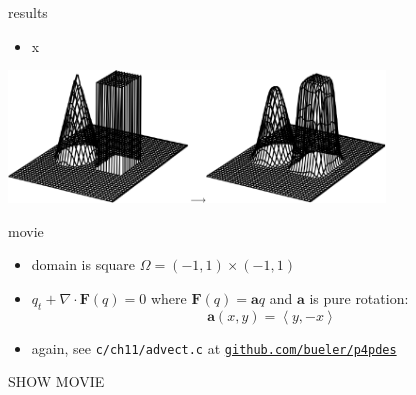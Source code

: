 \documentclass[10pt,hyperref,dvipsnames]{beamer}
\newcommand{\ba}{\mathbf{a}}
\newcommand{\bF}{\mathbf{F}}
\newcommand{\Div}{\nabla\cdot}
\begin{document}
\begin{frame}{results}

\begin{itemize}
\item x
\end{itemize}

\hfill \includegraphics[width=0.75\textwidth]{figs/bueler11p7}
\end{frame}


\begin{frame}{movie}

\begin{itemize}
\item domain is square $\Omega = (-1,1) \times (-1,1)$
\item $q_t + \Div \bF(q) = 0$ where $\bF(q) = \ba q$ and $\ba$ is pure rotation:
    $$\ba(x,y) = \left<y,-x\right>$$
\item again, see \texttt{c/ch11/advect.c} at \href{https://github.com/bueler/p4pdes}{\texttt{github.com/bueler/p4pdes}}
\end{itemize}

\vspace{10mm}
\begin{center}
\alert{SHOW MOVIE}
\end{center}

\end{frame}
\end{document}
